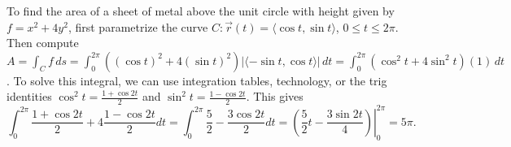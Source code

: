 \begin{example}
%
 To find the area of a sheet of metal above the unit circle with
  height given by $f=x^2+4y^2$, first parametrize the curve $C\colon \vec
  r(t) = \langle\cos t,\sin t\rangle$, $0\leq t\leq 2\pi$. Then compute $A = \int_C f\,ds =
  \int_0^{2\pi} ((\cos t)^2 + 4 (\sin t)^2) |\langle-\sin t,\cos t\rangle|\,dt =
  \int_0^{2\pi} (\cos^2 t + 4 \sin^2 t) (1)\,dt$. To solve this integral,
  we can use integration tables, technology, or the trig identities
  $\cos^2 t= \frac{1+\cos 2t}{2}$ and $\sin^2 t = \frac{1-\cos
    2t}{2}$. This gives $$\int_0^{2\pi} \frac{1+\cos 2t}{2} +4 \frac{1-\cos
    2t}{2}dt = \int_0^{2\pi} \frac{5}{2} - \frac{3\cos 2t}{2}dt =
  \left.\left(\frac{5}{2}t - \frac{3\sin 2t}{4}\right)\right|_0^{2\pi} = 5\pi.$$
\end{example}

